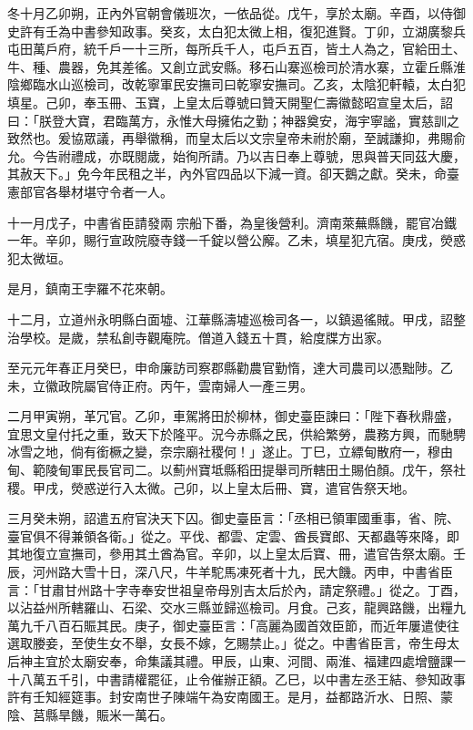 \begin{pinyinscope}
 冬十月乙卯朔，正內外官朝會儀班次，一依品從。戊午，享於太廟。辛酉，以侍御史許有壬為中書參知政事。癸亥，太白犯太微上相，復犯進賢。丁卯，立湖廣黎兵屯田萬戶府，統千戶一十三所，每所兵千人，屯戶五百，皆土人為之，官給田土、牛、種、農器，免其差徭。又創立武安縣。移石山寨巡檢司於清水寨，立霍丘縣淮陰鄉臨水山巡檢司，改乾寧軍民安撫司曰乾寧安撫司。乙亥，太陰犯軒轅，太白犯填星。己卯，奉玉冊、玉寶，上皇太后尊號曰贊天開聖仁壽徽懿昭宣皇太后，詔曰：「朕登大寶，君臨萬方，永惟大母擁佑之勤；神器奠安，海宇寧謐，實慈訓之致然也。爰協眾議，再舉徽稱，而皇太后以文宗皇帝未祔於廟，至誠謙抑，弗賜俞允。今告祔禮成，亦既閱歲，始徇所請。乃以吉日奉上尊號，思與普天同茲大慶，其赦天下。」免今年民租之半，內外官四品以下減一資。卻天鵝之獻。癸未，命臺憲部官各舉材堪守令者一人。



 十一月戊子，中書省臣請發兩宗船下番，為皇後營利。濟南萊蕪縣饑，罷官冶鐵一年。辛卯，賜行宣政院廢寺錢一千錠以營公廨。乙未，填星犯亢宿。庚戌，熒惑犯太微垣。



 是月，鎮南王孛羅不花來朝。



 十二月，立道州永明縣白面墟、江華縣濤墟巡檢司各一，以鎮遏徭賊。甲戌，詔整治學校。是歲，禁私創寺觀庵院。僧道入錢五十貫，給度牒方出家。



 至元元年春正月癸巳，申命廉訪司察郡縣勸農官勤惰，達大司農司以憑黜陟。乙未，立徽政院屬官侍正府。丙午，雲南婦人一產三男。



 二月甲寅朔，革冗官。乙卯，車駕將田於柳林，御史臺臣諫曰：「陛下春秋鼎盛，宜思文皇付托之重，致天下於隆平。況今赤縣之民，供給繁勞，農務方興，而馳騁冰雪之地，倘有銜橛之變，奈宗廟社稷何！」遂止。丁巳，立縹甸散府一，穆由甸、範陵甸軍民長官司二。以薊州寶坻縣稻田提舉司所轄田土賜伯顏。戊午，祭社稷。甲戌，熒惑逆行入太微。己卯，以上皇太后冊、寶，遣官告祭天地。



 三月癸未朔，詔遣五府官決天下囚。御史臺臣言：「丞相已領軍國重事，省、院、臺官俱不得兼領各衛。」從之。平伐、都雲、定雲、酋長寶郎、天都蟲等來降，即其地復立宣撫司，參用其土酋為官。辛卯，以上皇太后寶、冊，遣官告祭太廟。壬辰，河州路大雪十日，深八尺，牛羊駝馬凍死者十九，民大饑。丙申，中書省臣言：「甘肅甘州路十字寺奉安世祖皇帝母別吉太后於內，請定祭禮。」從之。丁酉，以沾益州所轄羅山、石梁、交水三縣並歸巡檢司。月食。己亥，龍興路饑，出糧九萬九千八百石賑其民。庚子，御史臺臣言：「高麗為國首效臣節，而近年屢遣使往選取媵妾，至使生女不舉，女長不嫁，乞賜禁止。」從之。中書省臣言，帝生母太后神主宜於太廟安奉，命集議其禮。甲辰，山東、河間、兩淮、福建四處增鹽課一十八萬五千引，中書請權罷征，止令催辦正額。乙巳，以中書左丞王結、參知政事許有壬知經筵事。封安南世子陳端午為安南國王。是月，益都路沂水、日照、蒙陰、莒縣旱饑，賑米一萬石。




\end{pinyinscope}
